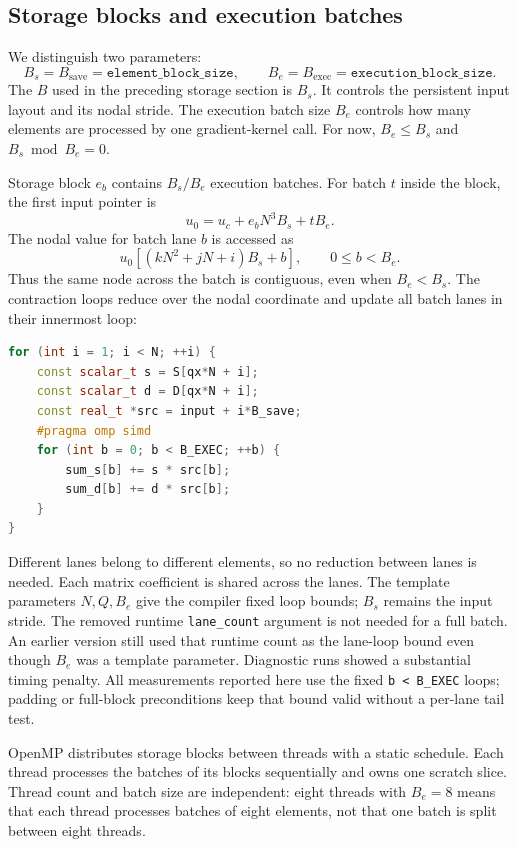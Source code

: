 \documentclass[11pt]{article}
\begin{document}
\subsection{Storage blocks and execution batches}

We distinguish two parameters:
\[
 B_s=B_{\mathrm{save}}=\texttt{element\_block\_size},\qquad
 B_e=B_{\mathrm{exec}}=\texttt{execution\_block\_size}.
\]
The \(B\) used in the preceding storage section is \(B_s\). It controls
the persistent input layout and its nodal stride. The execution batch size
\(B_e\) controls how many elements are processed by one gradient-kernel call.
For now, \(B_e\leq B_s\) and \(B_s\bmod B_e=0\).

Storage block \(e_b\) contains \(B_s/B_e\) execution batches. For batch
\(t\) inside the block, the first input pointer is
\[
 u_0=u_c+e_bN^3B_s+tB_e.
\]
The nodal value for batch lane \(b\) is accessed as
\[
 u_0\left[(kN^2+jN+i)B_s+b\right],\qquad 0\leq b<B_e.
\]
Thus the same node across the batch is contiguous, even when \(B_e<B_s\).
The contraction loops reduce over the nodal coordinate and update all batch
lanes in their innermost loop:
\begin{lstlisting}[language=C++]
for (int i = 1; i < N; ++i) {
    const scalar_t s = S[qx*N + i];
    const scalar_t d = D[qx*N + i];
    const real_t *src = input + i*B_save;
    #pragma omp simd
    for (int b = 0; b < B_EXEC; ++b) {
        sum_s[b] += s * src[b];
        sum_d[b] += d * src[b];
    }
}
\end{lstlisting}
Different lanes belong to different elements, so no reduction between lanes is
needed. Each matrix coefficient is shared across the lanes. The template
parameters \(N,Q,B_e\) give the compiler fixed loop bounds; \(B_s\) remains
the input stride. The removed runtime \texttt{lane\_count} argument is not
needed for a full batch.
An earlier version still used that runtime count as the lane-loop bound even
though \(B_e\) was a template parameter. Diagnostic runs showed a substantial
timing penalty. All measurements reported here use the fixed
\texttt{b < B\_EXEC} loops; padding or full-block preconditions keep that bound
valid without a per-lane tail test.

OpenMP distributes storage blocks between threads with a static schedule.
Each thread processes the batches of its blocks sequentially and owns one
scratch slice. Thread count and batch size are independent: eight threads with
\(B_e=8\) means that each thread processes batches of eight elements, not
that one batch is split between eight threads.
\end{document}
